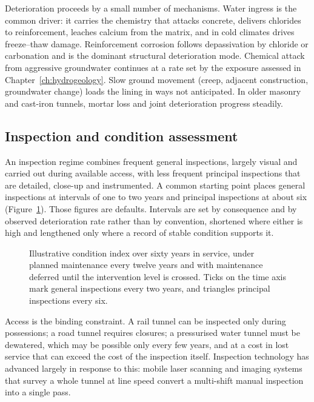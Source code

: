 Deterioration proceeds by a small number of mechanisms. Water ingress is the
common driver: it carries the chemistry that attacks concrete, delivers
chlorides to reinforcement, leaches calcium from the matrix, and in cold
climates drives freeze--thaw damage. Reinforcement corrosion follows
depassivation by chloride or carbonation and is the dominant structural
deterioration mode. Chemical attack from aggressive groundwater continues at a
rate set by the exposure assessed in Chapter~\ref{ch:hydrogeology}. Slow ground
movement (creep, adjacent construction, groundwater change) loads the
lining in ways not anticipated. In older masonry and cast-iron tunnels,
mortar loss and joint deterioration progress steadily.

\subsection{Inspection and condition assessment}
\label{sec:inspection-condition}

An inspection regime combines frequent general inspections, largely visual and
carried out during available access, with less frequent principal inspections
that are detailed, close-up and instrumented. A common starting point places
general inspections at intervals of one to two years and principal inspections
at about six (Figure~\ref{fig:deterioration-inspection}). Those figures are defaults. Intervals are
set by consequence and by observed deterioration rate rather than by
convention, shortened where either is high and lengthened only where a record
of stable condition supports it.

\begin{figure}[htbp]
\centering
{}
\caption{Illustrative condition index over sixty years in service, under planned maintenance every twelve years and with maintenance deferred until the intervention level is crossed. Ticks on the time axis mark general inspections every two years, and triangles principal inspections every six.}
\label{fig:deterioration-inspection}
\end{figure}

Access is the binding constraint. A rail tunnel can be inspected only during
possessions; a road tunnel requires closures; a pressurised water tunnel must
be dewatered, which may be possible only every few years, and at a cost in
lost service that can exceed the cost of the inspection itself. Inspection technology has advanced largely
in response to this: mobile laser scanning and imaging systems that survey a
whole tunnel at line speed convert a multi-shift manual inspection into a
single pass.

